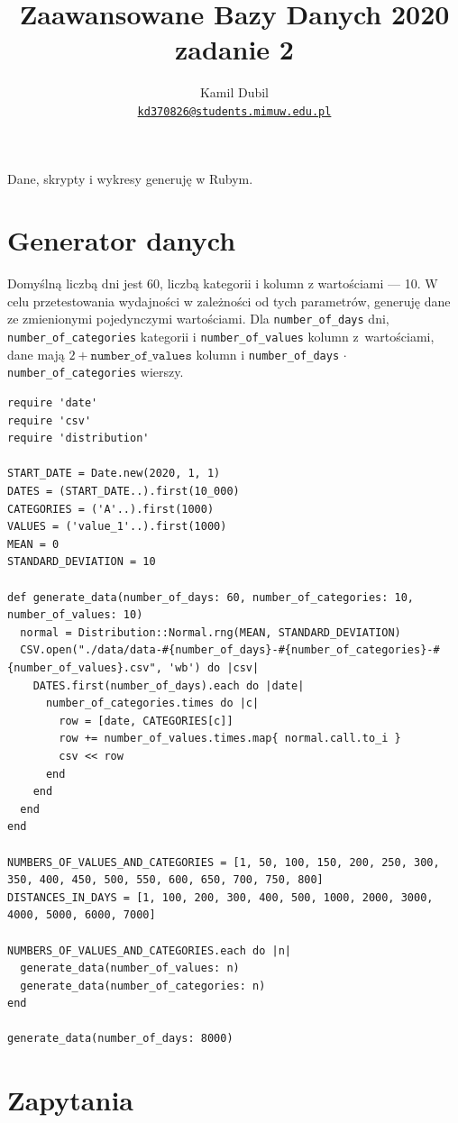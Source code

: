 \documentclass[a4paper,11pt]{article}
\title{Zaawansowane Bazy Danych 2020\\
\large zadanie 2}
\author{Kamil Dubil\\
\href{mailto:kd370826@students.mimuw.edu.pl}{\tt kd370826@students.mimuw.edu.pl}}
\begin{document}
\maketitle

Dane, skrypty i wykresy generuję w Rubym.


\section{Generator danych}

Domyślną liczbą dni jest 60, liczbą kategorii i kolumn z wartościami --- 10.
W celu przetestowania wydajności w zależności od tych parametrów, generuję dane ze zmienionymi pojedynczymi wartościami.
Dla \texttt{number\_of\_days} dni, \texttt{number\_of\_categories} kategorii i \texttt{number\_of\_values} kolumn z~wartościami,
dane mają $2 + \texttt{number\_of\_values}$ kolumn i \texttt{number\_of\_days} $\cdot$ \texttt{number\_of\_categories} wierszy.

\begin{lstlisting}
require 'date'
require 'csv'
require 'distribution'

START_DATE = Date.new(2020, 1, 1)
DATES = (START_DATE..).first(10_000)
CATEGORIES = ('A'..).first(1000)
VALUES = ('value_1'..).first(1000)
MEAN = 0
STANDARD_DEVIATION = 10

def generate_data(number_of_days: 60, number_of_categories: 10, number_of_values: 10)
  normal = Distribution::Normal.rng(MEAN, STANDARD_DEVIATION)
  CSV.open("./data/data-#{number_of_days}-#{number_of_categories}-#{number_of_values}.csv", 'wb') do |csv|
    DATES.first(number_of_days).each do |date|
      number_of_categories.times do |c|
        row = [date, CATEGORIES[c]]
        row += number_of_values.times.map{ normal.call.to_i }
        csv << row
      end
    end
  end
end

NUMBERS_OF_VALUES_AND_CATEGORIES = [1, 50, 100, 150, 200, 250, 300, 350, 400, 450, 500, 550, 600, 650, 700, 750, 800]
DISTANCES_IN_DAYS = [1, 100, 200, 300, 400, 500, 1000, 2000, 3000, 4000, 5000, 6000, 7000]

NUMBERS_OF_VALUES_AND_CATEGORIES.each do |n|
  generate_data(number_of_values: n)
  generate_data(number_of_categories: n)
end

generate_data(number_of_days: 8000)
\end{lstlisting}


\section{Zapytania}
\end{document}
